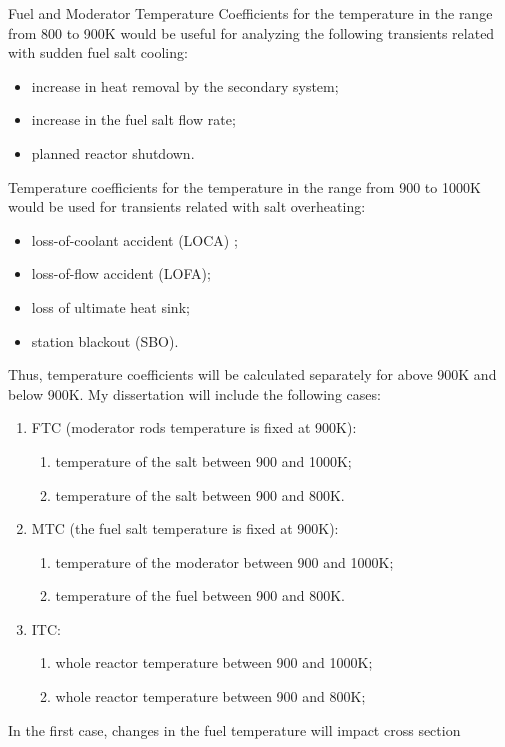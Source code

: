 Fuel and Moderator Temperature Coefficients for the temperature in the range 
from 800 to 900K would be useful for analyzing the following transients 
related with sudden fuel salt cooling: 
\begin{itemize}
	\item increase in heat removal by the secondary system;
	\item increase in the fuel salt flow rate;
	\item planned reactor shutdown.
\end{itemize}
Temperature coefficients for the temperature in the range from 900 to 1000K 
would be used for transients related with salt overheating: 
\begin{itemize}
	\item loss-of-coolant accident (LOCA) ;
	\item loss-of-flow accident (LOFA);
	\item loss of ultimate heat sink;
	\item  station blackout (SBO).
\end{itemize}
Thus, temperature coefficients will be calculated separately for above 900K 
and below 900K. My dissertation will include the following cases: 
\begin{enumerate}
	\item FTC (moderator rods temperature is fixed at 900K):
		\begin{enumerate}[label=(\alph*)]
			\item temperature of the salt between 900 and 1000K;
			\item temperature of the salt between 900 and 800K.
		\end{enumerate}
	\item MTC (the fuel salt temperature is fixed at 900K): 
		\begin{enumerate}[label=(\alph*)]
			\item temperature of the moderator between 900 and 1000K;
			\item temperature of the fuel between 900 and 800K.
		\end{enumerate}
	\item ITC: 
		\begin{enumerate}[label=(\alph*)]
			\item whole reactor temperature between 900 and 1000K;
			\item whole reactor temperature between 900 and 800K;
		\end{enumerate}
\end{enumerate}
In the first case, changes in the fuel temperature will impact cross section 
